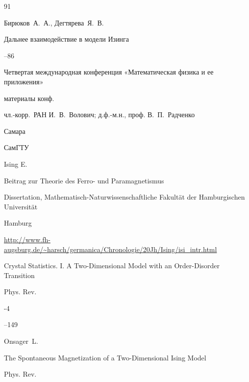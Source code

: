 \begin{thebibliography}{91}




\by  Бирюков~А.~А., Дегтярева~Я.~В. 

\paper Дальнее взаимодействие в модели Изинга

--86

\inbook Четвертая международная конференция «Математическая физика и ее приложения»

\bookinfo материалы конф. 

\eds чл.-корр.~РАН И.~В.~Волович; д.ф.-м.н., проф. В.~П.~Радченко

\publaddr Самара

\publ СамГТУ









\by Ising E.

\thesis

Beitrag zur Theorie des Ferro- und Paramagnetismus

\thesisinfo Dissertation, Mathematisch-Naturwissenschaftliche Fakult\"at der Hamburgischen Universit\"at

Hamburg


\elink \url{http://www.fh-augsburg.de/~harsch/germanica/Chronologie/20Jh/Ising/isi_intr.html}




\paper  Crystal Statistics. I. A Two-Dimensional Model with an Order-Disorder Transition


\jour Phys. Rev.


-4 

--149

\by Onsager~L.





\paper  The Spontaneous Magnetization of a Two-Dimensional Ising Model


\jour Phys. Rev. 


\end{thebibliography}
